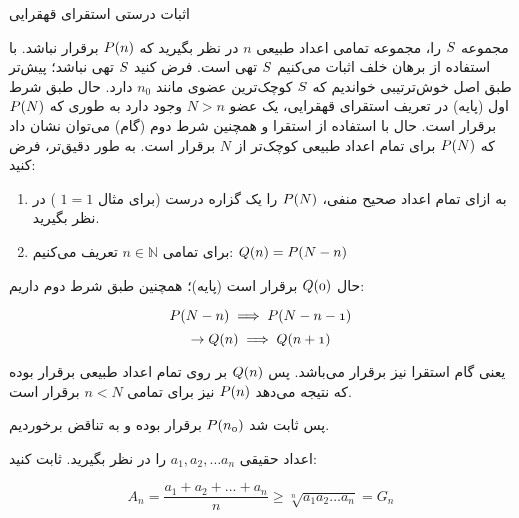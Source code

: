 \begin{EXTRA}{اثبات درستی استقرای قهقرایی}
    
    مجموعه
    $\mathnormal{S}$
    را، مجموعه تمامی اعداد طبیعی
    $n$
    در نظر بگیرید که
    $\mathnormal{P(n)}$
    برقرار نباشد.
    با استفاده از برهان خلف اثبات می‌کنیم
    $\mathnormal{S}$
    تهی است.
    فرض کنید
    $\mathnormal{S}$
    تهی نباشد؛ پیش‌تر طبق اصل خوش‌ترتیبی خواندیم که 
    $\mathnormal{S}$
    کوچک‌ترین عضوی مانند
    $n_0$
    دارد. حال طبق شرط اول
    (پایه)
    در تعریف استقرای قهقرایی، یک عضو
    $N > n$
    وجود دارد
    به طوری که
    $\mathnormal{P(N)}$
    برقرار است.
    حال با استفاده از استقرا و همچنین شرط دوم 
    (گام)
    می‌توان نشان داد که
    $\mathnormal{P(N)}$
    برای تمام اعداد طبیعی کوچک‌تر از
    $N$
    برقرار است.
    به طور دقیق‌تر، فرض کنید:

    \begin{enumerate}
        \item به ازای تمام اعداد صحیح منفی،
            $\mathnormal{P(N)}$
            را یک گزاره درست 
            (برای مثال
            $1 = 1$
            )
            در نظر بگیرید.

        \item 
            برای تمامی
            $n \in \mathbb{N}$
            تعریف می‌کنیم:
            $\mathnormal{Q(n)} = \mathnormal{P(N - n)}$

    \end{enumerate}
        حال 
        $\mathnormal{Q(0)}$
        برقرار است
        (پایه)؛
        همچنین طبق شرط دوم
        داریم:
        
        $$\mathnormal{P(N - n)} \implies \mathnormal{P(N - n - 1)}$$
        $$\rightarrow \mathnormal{Q(n)} \implies \mathnormal{Q(n + 1)}$$

        یعنی گام استقرا نیز برقرار می‌باشد.
        پس
        $\mathnormal{Q(n)}$
        بر روی تمام اعداد طبیعی برقرار بوده که نتیجه می‌دهد
        $\mathnormal{P(n)}$
        نیز برای تمامی
        $n < N$
        برقرار است.

        پس ثابت شد
        $\mathnormal{P(n_0)}$
        برقرار بوده و به تناقض برخوردیم.

\end{EXTRA}


\begin{PROBLEM}
    اعداد حقیقی 
    $a_1, a_2, \ldots a_n$
    را در نظر بگیرید.
    ثابت کنید:

    $$A_n = \frac{a_1 + a_2 + \ldots + a_n}{n} \geq \sqrt[n]{a_1a_2\ldots a_n} = G_n$$

\end{PROBLEM}

